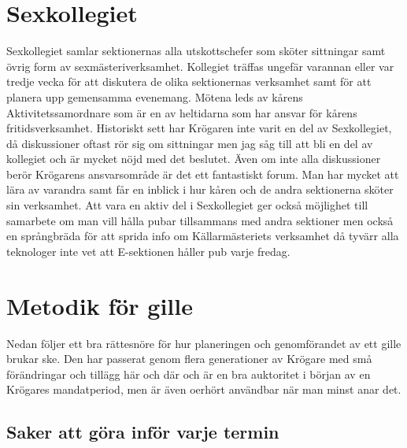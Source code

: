 \documentclass[10pt]{article}
\begin{document}
\section{Sexkollegiet}
Sexkollegiet samlar sektionernas alla utskottschefer som sköter sittningar samt övrig form av sexmästeriverksamhet. Kollegiet träffas ungefär varannan eller var tredje vecka för att diskutera de olika sektionernas verksamhet samt för att planera upp gemensamma evenemang. Mötena leds av kårens Aktivitetssamordnare som är en av heltidarna som har ansvar för kårens fritidsverksamhet. Historiskt sett har Krögaren inte varit en del av Sexkollegiet, då diskussioner oftast rör sig om sittningar men jag såg till att bli en del av kollegiet och är mycket nöjd med det beslutet. Även om inte alla diskussioner berör Krögarens ansvarsområde är det ett fantastiskt forum. Man har mycket att lära av varandra samt får en inblick i hur kåren och de andra sektionerna sköter sin verksamhet. Att vara en aktiv del i Sexkollegiet ger också möjlighet till samarbete om man vill hålla pubar tillsammans med andra sektioner men också en språngbräda för att sprida info om Källarmästeriets verksamhet då tyvärr alla teknologer inte vet att E-sektionen håller pub varje fredag.

\section{Metodik för gille}
Nedan följer ett bra rättesnöre för hur planeringen och genomförandet av ett gille brukar ske. Den har passerat genom flera generationer av Krögare med små förändringar och tillägg här och där och är en bra auktoritet i början av en Krögares mandatperiod, men är även oerhört användbar när man minst anar det.

    \subsection{Saker att göra inför varje termin}
\end{document}
